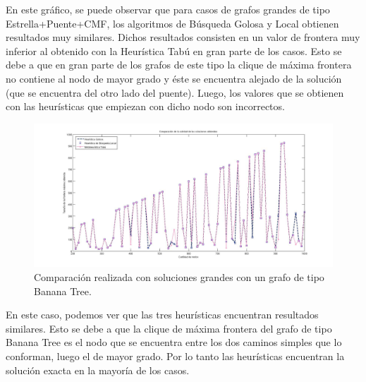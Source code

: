 En este gráfico, se puede observar que para casos de grafos grandes de tipo Estrella+Puente+CMF, los algoritmos de Búsqueda Golosa y Local obtienen resultados muy similares. Dichos resultados consisten en un valor de frontera muy inferior al obtenido con la Heurística Tabú en gran parte de los casos. Esto se debe a que en gran parte de los grafos de este tipo la clique de máxima frontera no contiene al nodo de mayor grado y éste se encuentra alejado de la solución (que se encuentra del otro lado del puente). Luego, los valores que se obtienen con las heurísticas que empiezan con dicho nodo son incorrectos.

 \begin{figure}[H] %
\begin{center}
\includegraphics[width=500pt]{../imgs/calidadSolucionesGrandes3.jpg}
\caption{Comparación realizada con soluciones grandes con un grafo de tipo Banana Tree.}
\end{center}
\end{figure}

En este caso, podemos ver que las tres heurísticas encuentran resultados similares. Esto se debe a que la clique de máxima frontera del grafo de tipo Banana Tree es el nodo que se encuentra entre los dos caminos simples que lo conforman, luego el de mayor grado. Por lo tanto las heurísticas encuentran la solución exacta en la mayoría de los casos.

